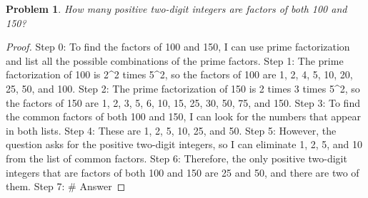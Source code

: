 \documentclass{article}
\newtheorem{theorem}{Problem}
\begin{document}
\begin{theorem}
How many positive two-digit integers are factors of both 100 and 150?
\end{theorem}

\begin{proof}
Step 0: To find the factors of 100 and 150, I can use prime factorization and list all the possible combinations of the prime factors.
Step 1: The prime factorization of 100 is 2^2 times 5^2, so the factors of 100 are 1, 2, 4, 5, 10, 20, 25, 50, and 100.
Step 2: The prime factorization of 150 is 2 times 3 times 5^2, so the factors of 150 are 1, 2, 3, 5, 6, 10, 15, 25, 30, 50, 75, and 150.
Step 3: To find the common factors of both 100 and 150, I can look for the numbers that appear in both lists.
Step 4: These are 1, 2, 5, 10, 25, and 50.
Step 5: However, the question asks for the positive two-digit integers, so I can eliminate 1, 2, 5, and 10 from the list of common factors.
Step 6: Therefore, the only positive two-digit integers that are factors of both 100 and 150 are 25 and 50, and there are two of them.
Step 7: # Answer
\end{proof}
\end{document}

